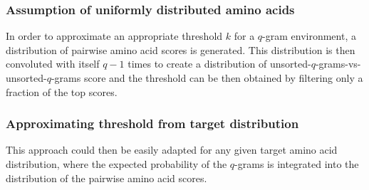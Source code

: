 \subsubsection{Assumption of uniformly distributed amino acids}
In order to approximate an appropriate threshold $k$ for a $q$-gram environment, a distribution of pairwise amino acid scores is generated. This distribution is then convoluted with itself $q-1$ times to create a distribution of unsorted-$q$-grams-vs-unsorted-$q$-grams score and the threshold can be then obtained by filtering only a fraction of the top scores.

\subsubsection{Approximating threshold from target distribution}
This approach could then be easily adapted for any given target amino acid distribution, where the expected probability of the $q$-grams is integrated into the distribution of the pairwise amino acid scores.